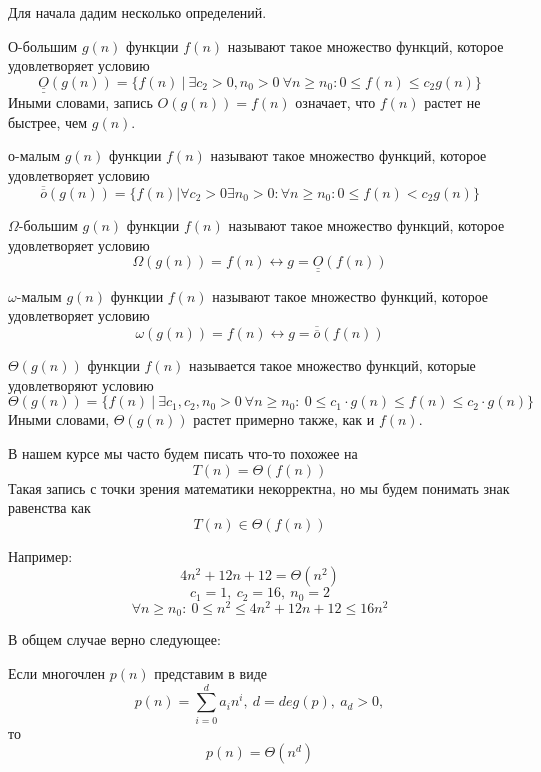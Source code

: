 \documentclass[../book.tex]{subfiles}
\begin{document}
	Для начала дадим несколько определений.
	\begin{definition}
		О-большим $g(n)$ функции $f(n)$ называют такое множество функций, которое удовлетворяет условию
		\[
		\underline{\underline{O}}(g(n)) = \{f(n) \ | \ \exists c_2>0, n_0>0 \ \forall n\geqslant n_0: 0 \leqslant f(n) \leqslant c_2 g(n)\}
		\]
		Иными словами, запись $O(g(n)) = f(n)$ означает, что $f(n)$ растет не быстрее, чем $g(n)$.
	\end{definition}
	\begin{definition}
		о-малым $g(n)$ функции $f(n)$ называют такое множество функций, которое удовлетворяет условию
		\[
		\overline{\overline{o}}(g(n)) = \{f(n)|\forall c_2>0\exists n_0>0:\forall n\geqslant  n_0: 0 \leqslant f(n) < c_2 g(n)\}
		\]
	\end{definition}
	
	\begin{definition}
		$\Omega$-большим $g(n)$ функции $f(n)$ называют такое множество функций, которое удовлетворяет условию
		\[
		\Omega(g(n)) = f(n) \leftrightarrow g = \underline{\underline{O}}(f(n))
		\]
	\end{definition}
	
	\begin{definition}
		$\omega$-малым $g(n)$ функции $f(n)$ называют такое множество функций, которое удовлетворяет условию
		\[
		\omega(g(n)) = f(n) \leftrightarrow g = \overline{\overline{o}}(f(n))
		\]
	\end{definition}
		

	
	\begin{definition}
		$\Theta(g(n))$ функции $f(n)$ называется такое множество функций, которые удовлетворяют условию
		\[\Theta(g(n)) = 
		\{
		f(n) \ | \ 
		\exists c_1, c_2,n_0 > 0 \ \forall n\geqslant n_0: \
		0\leqslant c_1\cdot g(n)\leqslant f(n) \leqslant c_2 \cdot g(n)
		\}
		\]
		Иными словами, $\Theta(g(n))$ растет примерно также, как и $f(n)$.
	\end{definition}

	
	В нашем курсе мы часто будем писать что-то похожее на
	\[
	T(n) = \Theta(f(n))
	\]
	Такая запись с точки зрения математики некорректна, но мы будем понимать знак равенства как
	\[
	T(n) \in \Theta(f(n))
	\]
	
	Например:
	\[
	4n^2+12n+12 = \Theta(n^2)
	\]
	\[
	c_1 = 1, \ c_2 = 16, \	n_0 = 2
	\]
	\[
	\forall n \geqslant n_0: \ 0 \leqslant n^2 \leqslant 4n^2+12n+12 \leqslant 16n^2
	\]
	
	В общем случае верно следующее:
	\begin{lemma}
		Если многочлен $p(n)$ представим в виде
		\[
		p(n) = \sum_{i = 0}^{d}	a_in^i, \ d = deg(p), \ a_d > 0, 
		\]
		то 
		\[
		p(n) = \Theta(n^d)
		\]
	\end{lemma}
	
\end{document}
